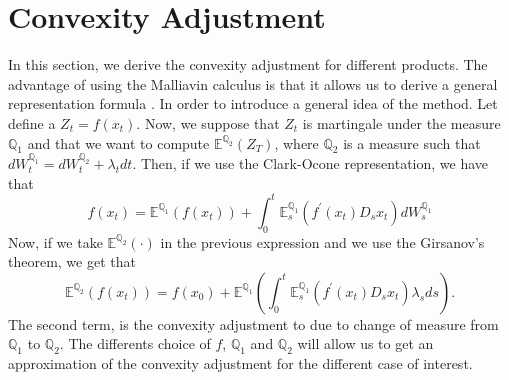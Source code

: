 \documentclass[a4paper,10pt]{article}
\newcommand{\1}{\mathbf{1}}
\begin{document}
 

\section{Convexity Adjustment}\label{sec:CA}
In this section, we derive the convexity adjustment for different products. The advantage of using the Malliavin calculus is that it allows us to derive a general representation formula . In order to introduce a general idea of the method. Let define a $Z_t = f(x_t)$. Now, we suppose that $Z_t$ is martingale under the measure $\mathbb{Q}_1$ and that we want to compute $\mathbb{E}^{\mathbb{Q}_2}\left(Z_T \right)$, where $\mathbb{Q}_2$ is a measure such that $dW^{\mathbb{Q}_1}_t = dW^{\mathbb{Q}_2}_t +\lambda_t dt$. Then, if we use the Clark-Ocone representation, we have that
\begin{equation*}
f(x_t) = \mathbb{E}^{\mathbb{Q}_1}\left(f(x_t)\right) + \int_{0}^{t} \mathbb{E}^{\mathbb{Q}_1}_s\left( f^{\prime}(x_t) D_s x_t  \right) dW^{\mathbb{Q}_1}_s
\end{equation*}
Now, if we take $\mathbb{E}^{\mathbb{Q}_2}\left( \cdot \right)$ in the previous expression and we use the Girsanov's theorem, we get that
\begin{equation}\label{general_convexity}
\mathbb{E}^{\mathbb{Q}_2}\left( f(x_t) \right) = f(x_0) + \mathbb{E}^{\mathbb{Q}_1} \left(\int_{0}^{t}  \mathbb{E}^{\mathbb{Q}_1}_s\left( f^{\prime}(x_t) D_s x_t  \right) \lambda_s ds \right). 
\end{equation}
The second term, is the convexity adjustment to due to change of measure from $\mathbb{Q}_1$ to $\mathbb{Q}_2$. The differents choice of $f$, $\mathbb{Q}_1$ and $\mathbb{Q}_2$ will allow us to get an approximation of the convexity adjustment for the different case of interest. 
\end{document}
